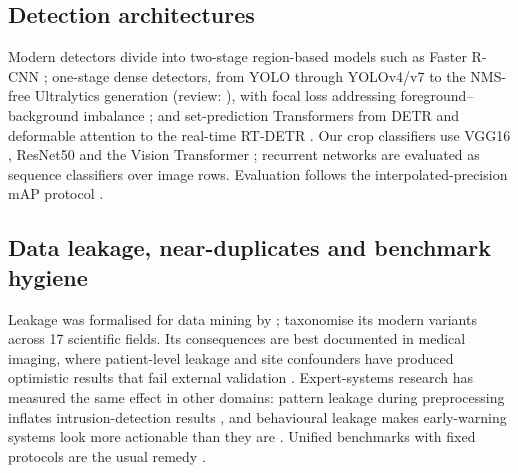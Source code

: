 \documentclass[review,12pt]{elsarticle}
\begin{document}
\subsection{Detection architectures}
Modern detectors divide into two-stage region-based models such as
Faster R-CNN \citep{ren2015faster}; one-stage dense detectors, from
YOLO \citep{redmon2016yolo} through YOLOv4/v7
\citep{bochkovskiy2020yolov4,wang2023yolov7} to the NMS-free
Ultralytics generation \citep{ultralytics_yolo26}
(review: \citep{terven2023yolo}), with focal loss addressing
foreground--background imbalance \citep{lin2017focal}; and
set-prediction Transformers from DETR \citep{carion2020detr} and
deformable attention \citep{zhu2021deformable} to the real-time
RT-DETR \citep{zhao2024rtdetr}. Our crop classifiers use VGG16
\citep{simonyan2015vgg}, ResNet50 \citep{he2016resnet} and the Vision
Transformer \citep{dosovitskiy2021vit,touvron2021deit,steiner2022vit};
recurrent networks \citep{hochreiter1997lstm,cho2014gru,
schuster1997bidirectional} are evaluated as sequence classifiers over
image rows. Evaluation follows the interpolated-precision mAP protocol
\citep{everingham2010voc,padilla2021metrics}.

\subsection{Data leakage, near-duplicates and benchmark hygiene}
Leakage was formalised for data mining by \citet{kaufman2012leakage};
\citet{kapoor2023leakage} taxonomise its modern variants across 17
scientific fields. Its consequences are best documented in medical
imaging, where patient-level leakage and site confounders have produced
optimistic results that fail external validation
\citep{zech2018variable,roberts2021common,bussola2021ai,
yagis2021effect}. Expert-systems research has measured the same effect
in other domains: pattern leakage during preprocessing inflates
intrusion-detection results \citep{bouke2023leakage}, and behavioural
leakage makes early-warning systems look more actionable than they are
\citep{le2027behavioural}. Unified benchmarks with fixed protocols are
the usual remedy \citep{kim2023unknownbench}.
\end{document}
